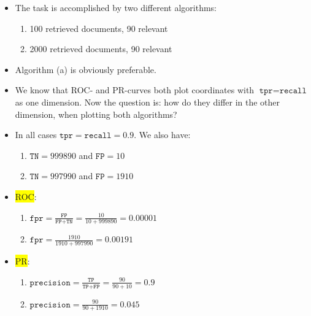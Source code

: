 \documentclass[12pt,a4paper]{article}
\begin{document}
\begin{enumerate}
\begin{description}
\begin{itemize}
\item The task is accomplished by two different algorithms:
\begin{enumerate}
\item 100 retrieved documents, 90 relevant
\item 2000 retrieved documents, 90 relevant
\end{enumerate}
\item Algorithm (a) is obviously preferable.
\item We know that ROC- and PR-curves both plot coordinates with $\texttt{tpr} = \texttt{recall}$ as one dimension. Now the question is: how do they differ in the other dimension, when plotting both algorithms?
\item In all cases $\texttt{tpr} = \texttt{recall} = 0.9$. We also have:
\begin{enumerate}
\item $\texttt{TN} = 999890$ and $\texttt{FP} = 10$
\item $\texttt{TN} = 997990$ and $\texttt{FP} = 1910$
\end{enumerate}
\item \colorbox{yellow}{ROC}:
\begin{enumerate}
\item $\texttt{fpr}= \frac{\texttt{FP}}{\texttt{FP+TN}} = \frac{10}{10+999890} = 0.00001$
\item $\texttt{fpr}= \frac{1910}{1910+997990} = 0.00191$
\end{enumerate}
\item \colorbox{yellow}{PR}:
\begin{enumerate}
\item $\texttt{precision}= \frac{\texttt{TP}}{\texttt{TP+FP}} = \frac{90}{90+10} = 0.9$
\item $\texttt{precision}= \frac{90}{90+1910} = 0.045$
\end{enumerate}
\end{itemize}
\end{description}
\end{enumerate}
\end{document}
